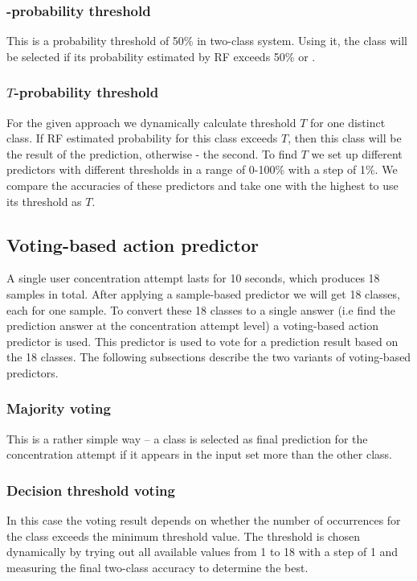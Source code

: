 \documentclass[12pt]{article}
\theoremstyle{definition}
\begin{document}
\subsubsection{-probability threshold}
This is a probability threshold of 50\% in two-class system. Using it, the class will be selected if its probability estimated by RF exceeds 50\% or .
\subsubsection{$T$-probability threshold}
For the given approach we dynamically calculate threshold $T$ for one distinct class. If RF estimated probability for this class exceeds $T$, then this class will be the result of the prediction, otherwise - the second. To find $T$ we set up different predictors with different thresholds in a range of 0-100\% with a step of 1\%. We compare the accuracies of these predictors and take one with the highest to use its threshold as $T$.

\subsection{Voting-based action predictor}
A single user concentration attempt lasts for 10 seconds, which produces 18 samples in total. After applying a sample-based predictor we will get 18 classes, each for one sample. To convert these 18 classes to a single answer (i.e find the prediction answer at the concentration attempt level) a voting-based action predictor is used. This predictor is used to vote for a prediction result based on the 18 classes. The following subsections describe the two variants of voting-based predictors.

\subsubsection{Majority voting}

This is a rather simple way -- a class is selected as final prediction for the concentration attempt if it appears in the input set more than the other class. 

\subsubsection{Decision threshold voting}
In this case the voting result depends on whether the number of occurrences for the class exceeds the minimum threshold value. The threshold is chosen dynamically by trying out all available values from 1 to 18 with a step of 1 and measuring the final two-class accuracy to determine the best. 
\end{document}
